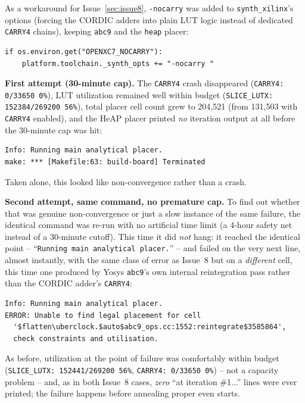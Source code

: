 \documentclass[11pt]{article}
\begin{document}
As a workaround for Issue~\ref{sec:issue8}, \lstinline{-nocarry} was
added to \lstinline{synth_xilinx}'s options (forcing the CORDIC adders
into plain LUT logic instead of dedicated \lstinline{CARRY4} chains),
keeping \lstinline{abc9} and the \lstinline{heap} placer:
\begin{lstlisting}[style=codeblk]
if os.environ.get("OPENXC7_NOCARRY"):
    platform.toolchain._synth_opts += "-nocarry "
\end{lstlisting}

\textbf{First attempt (30-minute cap).} The \lstinline{CARRY4} crash
disappeared (\lstinline{CARRY4: 0/33650 0%}), LUT utilization remained
well within budget (\lstinline{SLICE_LUTX: 152384/269200 56%}), total
placer cell count grew to 204{,}521 (from 131{,}503 with
\lstinline{CARRY4} enabled), and the HeAP placer printed \emph{no}
iteration output at all before the 30-minute cap was hit:
\begin{lstlisting}[style=termout]
Info: Running main analytical placer.
make: *** [Makefile:63: build-board] Terminated
\end{lstlisting}
Taken alone, this looked like non-convergence rather than a crash.

\textbf{Second attempt, same command, no premature cap.} To find out
whether that was genuine non-convergence or just a slow instance of the
same failure, the identical command was re-run with no artificial time
limit (a 4-hour safety net instead of a 30-minute cutoff). This time it
did \emph{not} hang: it reached the identical point --
``\texttt{Running main analytical placer.}'' -- and failed on the very
next line, almost instantly, with the same class of error as Issue~8 but
on a \emph{different} cell, this time one produced by Yosys
\lstinline{abc9}'s own internal reintegration pass rather than the CORDIC
adder's \lstinline{CARRY4}:
\begin{lstlisting}[style=termout]
Info: Running main analytical placer.
ERROR: Unable to find legal placement for cell
  '$flatten\uberclock.$auto$abc9_ops.cc:1552:reintegrate$3585864',
  check constraints and utilisation.
\end{lstlisting}
As before, utilization at the point of failure was comfortably within
budget (\lstinline{SLICE_LUTX: 152441/269200 56%}, \lstinline{CARRY4: 0/33650 0%}) -- not a capacity problem -- and, as in both Issue~8 cases,
\emph{zero} ``at iteration \#1...'' lines were ever printed; the failure
happens before annealing proper even starts.
\end{document}

